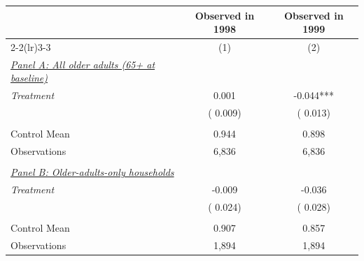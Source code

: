 \begin{tabular}{lcc} \hline \hline
& Observed in 1998 & Observed in 1999 \\ 
\cmidrule(lr){2-2}\cmidrule(lr){3-3}
& \multicolumn{1}{c}{(1)} & \multicolumn{1}{c}{(2)} \\ \toprule
\underline{\textit{Panel A: All older adults (65+ at baseline)}} \\ 
\textit{Treatment} & 0.001 & -0.044*** \\ 
 & (    0.009) & (    0.013) \\ 
  & & \\ 
Control Mean &     0.944 &     0.898 \\ 
Observations &        6,836 &        6,836 \\ 
  & & \\ 
\underline{\textit{Panel B: Older-adults-only households}} \\ 
\textit{Treatment} & -0.009 & -0.036 \\ 
 & (    0.024) & (    0.028) \\ 
  & & \\ 
Control Mean &     0.907 &     0.857 \\ 
Observations &        1,894 &        1,894 \\ \bottomrule
\end{tabular}